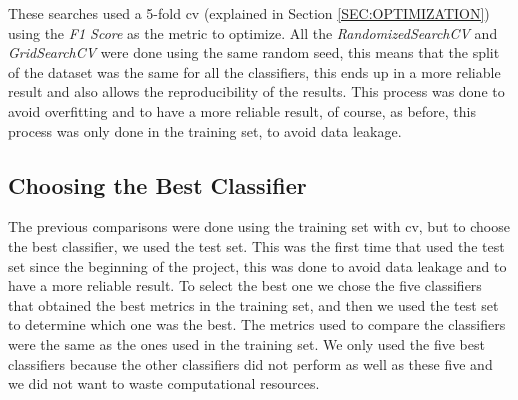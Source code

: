 These searches 
used
a 5-fold \ac{cv} (explained in Section \ref{SEC:OPTIMIZATION}) using the \textit{F1 Score} as the metric to optimize. All the \textit{RandomizedSearchCV} and \textit{GridSearchCV} were done using the same random seed, this means that the split of the dataset was the same for all the classifiers, this ends up in a more reliable result and also allows the reproducibility of the results. This process was done to avoid overfitting and to have a more reliable result, of course, as before, this process was only done in the training set, to avoid data leakage.

\subsection{Choosing the Best Classifier\label{SEC:CHOOSING}}

The previous comparisons were done using the training set with \acl{cv}, but to choose the best classifier, we used the test set. This was the first time that used the test set since the beginning of the project, this was done to avoid data leakage and to have a more reliable result. To select the best one we chose the five classifiers that obtained the best metrics in the training set, and then we used the test set to determine which one was the best. The metrics used to compare the classifiers were the same as the ones used in the training set. We only used the five best classifiers because the other classifiers did not perform as well as these five and we did not want to waste computational resources.
